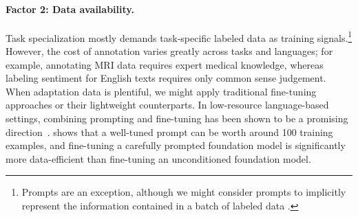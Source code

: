 \paragraph{Factor 2: Data availability.} Task specialization mostly demands task-specific labeled data as training signals.\footnote{Prompts are an exception, although we might consider prompts to implicitly represent the information contained in a batch of labeled data \cite{le-scao-rush-2021-many}.} However, the cost of annotation varies greatly across tasks and languages; for example, annotating MRI data requires expert medical knowledge, whereas labeling sentiment for English texts requires only common sense judgement. When adaptation data is plentiful, we might apply traditional fine-tuning approaches or their lightweight counterparts. In low-resource language-based settings, combining prompting and fine-tuning has been shown to be a promising direction~\citep{schick-schutze-2021-exploiting, schick-schutze-2021-just,gao2020fewshot,perez2021true,logan-cutting-2021,min2021noisy}. \citet{le-scao-rush-2021-many} shows that a well-tuned prompt can be worth around 100 training examples, and fine-tuning a carefully prompted foundation model is significantly more data-efficient than fine-tuning an unconditioned foundation model. 

